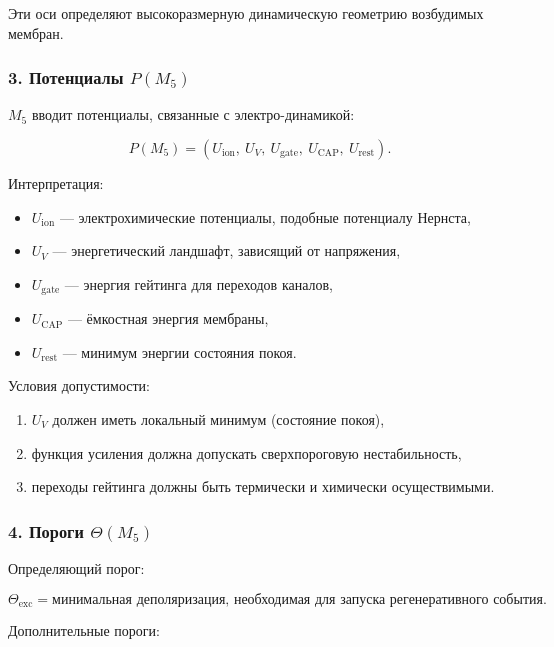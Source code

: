 Эти оси определяют высокоразмерную динамическую геометрию возбудимых мембран.

\subsubsection*{3. Потенциалы \texorpdfstring{$P(M_5)$}{P(M_5)}}

$M_5$ вводит потенциалы, связанные с электро-динамикой:

\[
P(M_5) =
(U_{\mathrm{ion}},\ U_V,\ U_{\mathrm{gate}},\
U_{\mathrm{CAP}},\ U_{\mathrm{rest}}).
\]

Интерпретация:

\begin{itemize}
    \item $U_{\mathrm{ion}}$ — электрохимические потенциалы, подобные потенциалу Нернста,
    \item $U_V$ — энергетический ландшафт, зависящий от напряжения,
    \item $U_{\mathrm{gate}}$ — энергия гейтинга для переходов каналов,
    \item $U_{\mathrm{CAP}}$ — ёмкостная энергия мембраны,
    \item $U_{\mathrm{rest}}$ — минимум энергии состояния покоя.
\end{itemize}

Условия допустимости:

\begin{enumerate}
    \item $U_V$ должен иметь локальный минимум (состояние покоя),
    \item функция усиления должна допускать сверхпороговую нестабильность,
    \item переходы гейтинга должны быть термически и химически осуществимыми.
\end{enumerate}

\subsubsection*{4. Пороги \texorpdfstring{$\Theta(M_5)$}{\Theta(M_5)}}

Определяющий порог:

\[
\Theta_{\mathrm{exc}} = \text{минимальная деполяризация, необходимая для запуска регенеративного события}.
\]

Дополнительные пороги:


